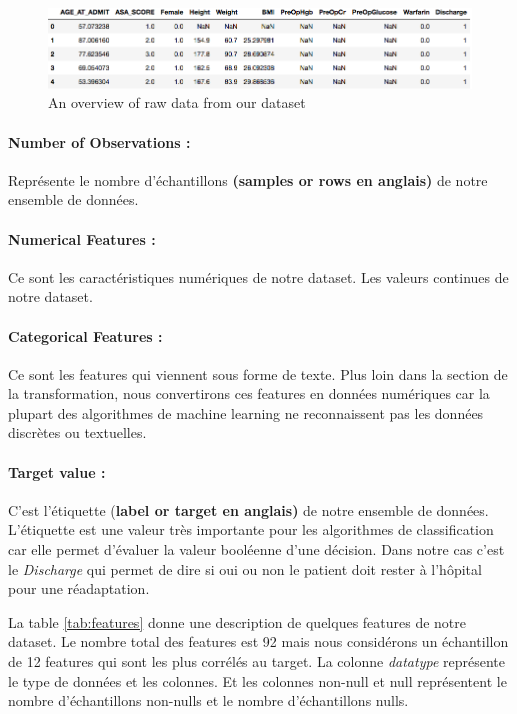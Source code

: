 \documentclass[12pt, french]{report}
\begin{document}
\begin{figure}[h]
\includegraphics[width=18cm]{images/examplesfeatures.png}
\caption{An overview of raw data from our dataset}
\label{fig:samplesdataset}
\end{figure}


\paragraph*{Number of Observations :} Représente le nombre d'échantillons \textbf{(samples or rows en anglais)} de notre ensemble de données. 

\paragraph*{ Numerical Features :} Ce sont les caractéristiques numériques de notre dataset. Les valeurs continues de notre dataset.

\paragraph*{ Categorical Features :} Ce sont les features qui viennent sous forme de texte. Plus loin dans la section de la transformation, nous convertirons ces features en données numériques car la plupart des algorithmes de machine learning ne reconnaissent pas les données discrètes ou textuelles.

\paragraph*{ Target value :} C'est l'étiquette (\textbf{label or target en anglais)} de notre ensemble de données. L'étiquette est une valeur très importante pour les algorithmes de classification car elle permet d'évaluer la valeur booléenne d'une décision. Dans notre cas c'est le \textit{Discharge} qui permet de dire si oui ou non le patient doit rester à l'hôpital pour une réadaptation. 

La table \ref{tab:features} donne une description de quelques features de notre dataset. Le nombre total des features est 92 mais nous considérons un échantillon de 12 features qui sont les plus corrélés au target. La colonne \textit{datatype} représente le type de données et les colonnes. Et les colonnes non-null et null représentent le nombre d'échantillons non-nulls et le nombre d'échantillons nulls.
\end{document}
